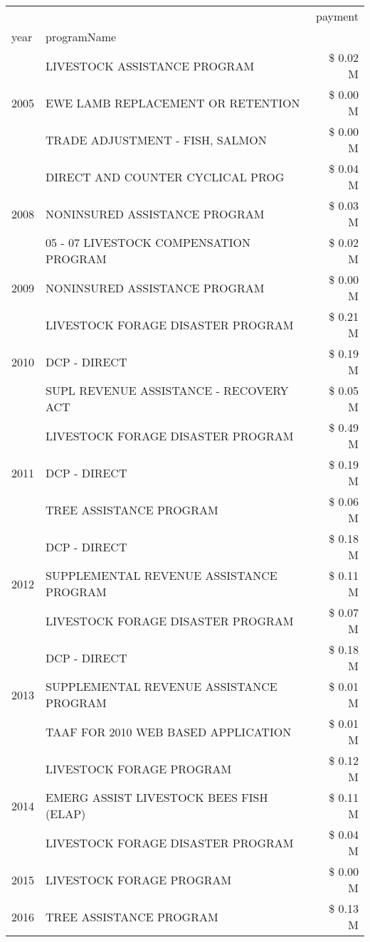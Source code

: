 \begin{tabular}{llr}
\toprule
 &  & payment \\
year & programName &  \\
\midrule
\multirow[t]{3}{*}{2005} & LIVESTOCK ASSISTANCE PROGRAM & \$ 0.02 M \\
 & EWE LAMB REPLACEMENT OR RETENTION & \$ 0.00 M \\
 & TRADE ADJUSTMENT - FISH, SALMON & \$ 0.00 M \\
\cline{1-3}
\multirow[t]{3}{*}{2008} & DIRECT AND COUNTER CYCLICAL PROG & \$ 0.04 M \\
 & NONINSURED ASSISTANCE PROGRAM & \$ 0.03 M \\
 & 05 - 07 LIVESTOCK COMPENSATION PROGRAM & \$ 0.02 M \\
\cline{1-3}
2009 & NONINSURED ASSISTANCE PROGRAM & \$ 0.00 M \\
\cline{1-3}
\multirow[t]{3}{*}{2010} & LIVESTOCK FORAGE DISASTER PROGRAM & \$ 0.21 M \\
 & DCP - DIRECT & \$ 0.19 M \\
 & SUPL REVENUE ASSISTANCE - RECOVERY ACT & \$ 0.05 M \\
\cline{1-3}
\multirow[t]{3}{*}{2011} & LIVESTOCK FORAGE DISASTER PROGRAM & \$ 0.49 M \\
 & DCP - DIRECT & \$ 0.19 M \\
 & TREE ASSISTANCE PROGRAM & \$ 0.06 M \\
\cline{1-3}
\multirow[t]{3}{*}{2012} & DCP - DIRECT & \$ 0.18 M \\
 & SUPPLEMENTAL REVENUE ASSISTANCE PROGRAM & \$ 0.11 M \\
 & LIVESTOCK FORAGE DISASTER PROGRAM & \$ 0.07 M \\
\cline{1-3}
\multirow[t]{3}{*}{2013} & DCP - DIRECT & \$ 0.18 M \\
 & SUPPLEMENTAL REVENUE ASSISTANCE PROGRAM & \$ 0.01 M \\
 & TAAF FOR 2010 WEB BASED APPLICATION & \$ 0.01 M \\
\cline{1-3}
\multirow[t]{3}{*}{2014} & LIVESTOCK FORAGE PROGRAM & \$ 0.12 M \\
 & EMERG ASSIST LIVESTOCK BEES FISH (ELAP) & \$ 0.11 M \\
 & LIVESTOCK FORAGE DISASTER PROGRAM & \$ 0.04 M \\
\cline{1-3}
2015 & LIVESTOCK FORAGE PROGRAM & \$ 0.00 M \\
\cline{1-3}
\multirow[t]{2}{*}{2016} & TREE ASSISTANCE PROGRAM & \$ 0.13 M \\

\end{tabular}

